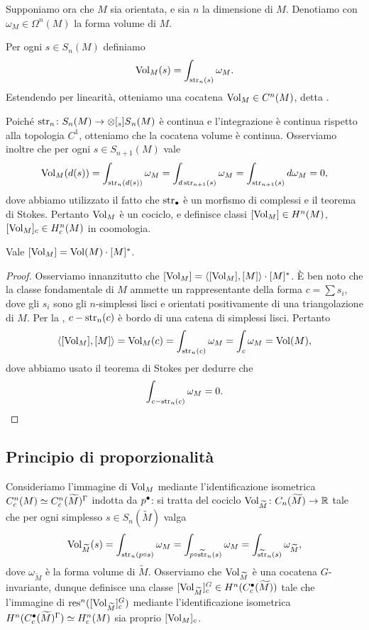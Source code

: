 Supponiamo ora che $M$ sia orientata, e sia $n$ la dimensione di $M$. Denotiamo con $\omega_M\in\Omega^n(M)$ la forma volume di $M$.
\begin{definition}
Per ogni $s\in S_n(M)$ definiamo
\[
\operatorname{Vol}_M(s)=\int_{\operatorname{str}_n(s)}\omega_M.
\]
Estendendo per linearità, otteniamo una cocatena $\operatorname{Vol}_M\in C^n(M)$, detta .
\end{definition}
Poiché $\map{\str_n}{S_n(M)}{\prepost[_s]{S}{_n}(M)}$ è continua e l'integrazione è continua rispetto alla topologia $C^1$, otteniamo che la cocatena volume è continua. Osserviamo inoltre che per ogni $s\in S_{n+1}(M)$ vale
\[
\operatorname{Vol}_M(d(s))=\int_{\operatorname{str}_n(d(s))}\omega_M=\int_{d\operatorname{str}_{n+1}(s)}\omega_M=\int_{\operatorname{str}_{n+1}(s)}d\omega_M=0,
\]
dove abbiamo utilizzato il fatto che $\operatorname{str}_\bullet$ è un morfismo di complessi e il teorema di Stokes. Pertanto $\operatorname{Vol}_M$ è un cociclo, e definisce classi $[\operatorname{Vol}_M]\in H^n(M)$, $[\operatorname{Vol}_M]_c\in H^n_c(M)$ in coomologia.

\begin{lemma}
Vale $[\operatorname{Vol}_M]=\operatorname{Vol}(M)\cdot[M]^*$.
\end{lemma}
\begin{proof}
Osserviamo innanzitutto che $[\operatorname{Vol}_M]=\langle[\operatorname{Vol}_M],[M]\rangle\cdot[M]^*$. È ben noto che la classe fondamentale di $M$ ammette un rappresentante della forma $c=\sum s_i$, dove gli $s_i$ sono gli $n$-simplessi lisci e orientati positivamente di una triangolazione di $M$. Per la , $c-\operatorname{str}_n(c)$ è bordo di una catena di simplessi lisci. Pertanto
\[
\langle[\operatorname{Vol}_M],[M]\rangle=\operatorname{Vol}_M(c)=\int_{\operatorname{str}_n(c)}\omega_M=\int_{c}\omega_M=\operatorname{Vol}(M),
\]
dove abbiamo usato il teorema di Stokes per dedurre che
\[
\int_{c-\operatorname{str}_n(c)}\omega_M=0.\qedhere
\]
\end{proof}

\subsection{Principio di proporzionalità}

Consideriamo l'immagine di $\operatorname{Vol}_M$ mediante l'identificazione isometrica $C^n_c(M)\simeq C^n_c(\widetilde M)^\Gamma$ indotta da $p^\bullet$: si tratta del cociclo $\map{\Vol_{\widetilde M}}{C_n(\widetilde M)}{\RR}$ tale che per ogni simplesso $s\in S_n(\widetilde M)$ valga
\[
\operatorname{Vol}_{\widetilde M}(s)=\int_{\operatorname{str}_n(p\circ s)}\omega_M=\int_{p\circ\widetilde{\operatorname{str}}_n(s)}\omega_M=\int_{\widetilde{\operatorname{str}}_n(s)}\omega_{\widetilde M},
\]
dove $\omega_{\widetilde M}$ è la forma volume di $\widetilde M$. Osserviamo che $\operatorname{Vol}_{\widetilde M}$ è una cocatena $G$-invariante, dunque definisce una classe $[\operatorname{Vol}_{\widetilde M}]^G_c\in H^n(C^\bullet_c(\widetilde M))$ tale che l'immagine di $\operatorname{res}^n([\operatorname{Vol}_{\widetilde M}]^G_c)$ mediante l'identificazione isometrica $H^n(C^\bullet_c(\widetilde M)^\Gamma)\simeq H^n_c(M)$ sia proprio $[\operatorname{Vol}_M]_c$.

